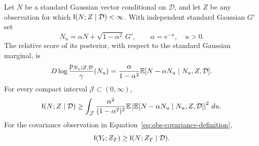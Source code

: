 \begin{lemma}
\label{lem:obs-ou-score}
Let $N$ be a standard Gaussian vector conditional on $\mathcal D$,
and let $Z$ be any observation for which
$\mathsf I(N;Z\mid\mathcal D)<\infty$.  With independent standard
Gaussian $G'$ set
\[
 N_u=\alpha N+\sqrt{1-\alpha^2}\,G',\qquad \alpha=e^{-u},\quad u>0.
\]
The relative score of its posterior, with respect to the standard
Gaussian marginal, is
\begin{equation}\label{eq:obs-ou-score}
 D\log\frac{p_{N_u\mid Z,\mathcal D}}{\gamma}(N_u)
 =\frac{\alpha}{1-\alpha^2}
   \mathbb E[N-\alpha N_u\mid N_u,Z,\mathcal D].
\end{equation}
For every compact interval $\mathcal J\subset(0,\infty)$,
\begin{equation}\label{eq:obs-ou-information}
 \mathsf I(N;Z\mid\mathcal D)
 \ge\int_{\mathcal J}\frac{\alpha^2}{(1-\alpha^2)^2}
 \mathbb E\left|\mathbb E[N-\alpha N_u\mid N_u,Z,\mathcal D]\right|^2\,du.
\end{equation}
For the covariance observation in
Equation~\eqref{eq:obs-covariance-definition},
\begin{equation}\label{eq:obs-data-processing}
 \mathsf I(Y_t;Z_T)\ge\mathsf I(N;Z_T\mid\mathcal D).
\end{equation}
\end{lemma}

